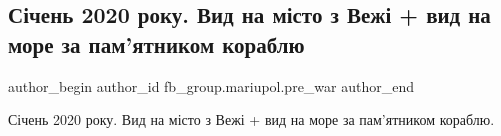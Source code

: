  
 
 
 
 

\subsection{Січень 2020 року. Вид на місто з Вежі + вид на море за пам'ятником кораблю}
\label{sec:22_04_2023.fb.fb_group.mariupol.pre_war.1.sichen_2020_vyd_na_misto_s_vezhi_vyd_na_more_za_patmjatnykom_korablju}

\ifcmt
 author_begin
   author_id fb_group.mariupol.pre_war
 author_end
\fi

Січень 2020 року. Вид на місто з Вежі + вид на море за пам'ятником кораблю.
